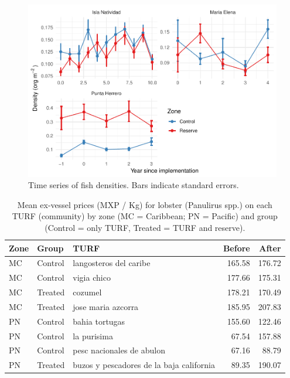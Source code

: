 \documentclass[utf8]{frontiers_suppmat} %
\begin{document}
\clearpage

\begin{figure}
\centering
\includegraphics{SupplementaryMaterial_files/figure-latex/unnamed-chunk-7-1.pdf}
\caption{\label{fig:unnamed-chunk-7}Time series of fish densities. Bars
indicate standard errors.}
\end{figure}

\clearpage

\begin{table}

\caption{\label{tab:unnamed-chunk-8}Mean ex-vessel prices (MXP / Kg) for lobster (Panulirus spp.) on each TURF (community) by zone (MC = Caribbean; PN = Pacific) and group (Control = only TURF, Treated = TURF and reserve).}
\centering
\begin{tabular}[t]{lllrr}
\toprule
Zone & Group & TURF & Before & After\\
\midrule
MC & Control & langosteros del caribe & 165.58 & 176.72\\
MC & Control & vigia chico & 177.66 & 175.31\\
MC & Treated & cozumel & 178.21 & 170.49\\
MC & Treated & jose maria azcorra & 185.95 & 207.83\\
PN & Control & bahia tortugas & 155.60 & 122.46\\
\addlinespace
PN & Control & la purisima & 67.54 & 157.88\\
PN & Control & pesc nacionales de abulon & 67.16 & 88.79\\
PN & Treated & buzos y pescadores de la baja california & 89.35 & 190.07\\
\bottomrule
\end{tabular}
\end{table}
\end{document}
